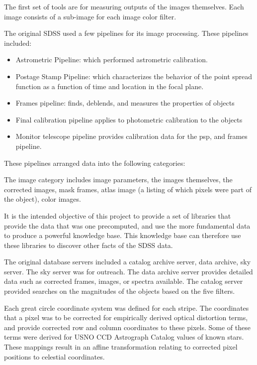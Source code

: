 The first set of tools are for measuring outputs of the images themselves.  Each image consists of a sub-image for each image color filter.   

The original SDSS used a few pipelines for its image processing.  These pipelines included:
\begin{itemize}
\item Astrometric Pipeline: which performed astrometric calibration.  
\item Postage Stamp Pipeline: which characterizes the behavior of the point spread function as a function of time and location in the focal plane.
\item Frames pipeline: finds, deblends, and measures the properties of objects
\item Final calibration pipeline applies to photometric calibration to the objects
\item Monitor telescope pipeline provides calibration data for the psp, and frames pipeline.  
\end{itemize}
These pipelines arranged data into the following categories:
\begin{itemize}
\item Image Properties
\item Spectroscopic parameters
\item Color Images
\item FITS images (corrected images}
\item Spectra:
\end{itemize}

The image category includes image parameters, the images themselves, the corrected images, mask frames, atlas image (a listing of which pixels were part of the object),  color images.  

It is the intended objective of this project to provide a set of libraries that provide the data that was one precomputed, and use the more fundamental data to produce a powerful knowledge base.  This knowledge base can therefore use these libraries to discover other facts of the SDSS data.    

The original database servers included a catalog archive server, data archive, sky server.  The sky server was for outreach.  The data archive server provides detailed data such as corrected frames, images, or spectra available.  The catalog server provided searches on the magnitudes of the objects based on the five filters.  

Each great circle coordinate system was defined for each stripe.  The coordinates that a pixel was to be corrected for empirically derived optical distortion terms, and provide corrected row and column coordinates to these pixels.   Some of these terms were derived for USNO CCD Astrograph Catalog values of known stars. These mappings result in an affine transformation relating to corrected pixel positions to celestial coordinates.  


